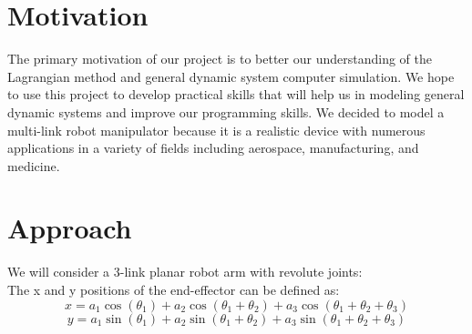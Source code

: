 \documentclass[a4paper]{article}
\begin{document}
\section*{Motivation}

The primary motivation of our project is to better our understanding of the Lagrangian method and general dynamic system computer simulation.  We hope to use this project to develop practical skills that will help us in modeling general dynamic systems and improve our programming skills. We decided to model a multi-link robot manipulator because it is a realistic device with numerous applications in a variety of fields including aerospace, manufacturing, and medicine.


\section*{Approach}


\noindent
We will consider a 3-link planar robot arm with revolute joints:\\

\noindent The x and y positions of the end-effector can be defined as:
$$x = a_1\cos(\theta_1) + a_2\cos(\theta_1 + \theta_2) + a_3\cos(\theta_1 + \theta_2 + \theta_3)$$
$$y = a_1\sin(\theta_1) + a_2\sin(\theta_1 + \theta_2) + a_3\sin(\theta_1 + \theta_2 + \theta_3)$$
\end{document}
